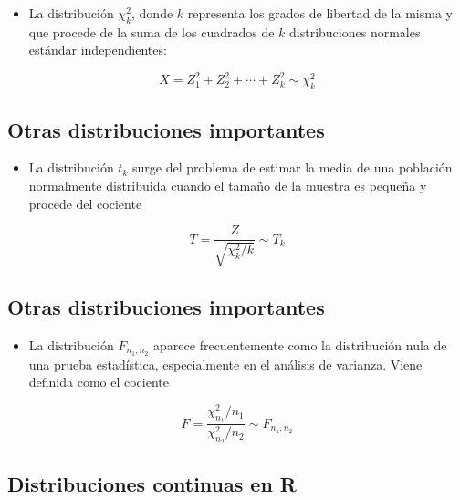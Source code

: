 \documentclass[
]{article}
\providecommand{\tightlist}{%
  \setlength{\itemsep}{0pt}\setlength{\parskip}{0pt}}
\begin{document}
\begin{itemize}
\tightlist
\item
  La distribución \(\chi^2_k\), donde \(k\) representa los grados de
  libertad de la misma y que procede de la suma de los cuadrados de
  \(k\) distribuciones normales estándar independientes:
\end{itemize}

\[X = Z_1^2 + Z_2^2+\cdots + Z_k^2\sim \chi_k^2\]

\hypertarget{otras-distribuciones-importantes-1}{%
\subsection{Otras distribuciones
importantes}\label{otras-distribuciones-importantes-1}}

\begin{itemize}
\tightlist
\item
  La distribución \(t_k\) surge del problema de estimar la media de una
  población normalmente distribuida cuando el tamaño de la muestra es
  pequeña y procede del cociente
\end{itemize}

\[T = \frac{Z}{\sqrt{\chi^2_k/k}}\sim T_k\]

\hypertarget{otras-distribuciones-importantes-2}{%
\subsection{Otras distribuciones
importantes}\label{otras-distribuciones-importantes-2}}

\begin{itemize}
\tightlist
\item
  La distribución \(F_{n_1,n_2}\) aparece frecuentemente como la
  distribución nula de una prueba estadística, especialmente en el
  análisis de varianza. Viene definida como el cociente
\end{itemize}

\[F = \frac{\chi^2_{n_1}/n_1}{\chi^2_{n_2}/n_2}\sim F_{n_1,n_2}\]

\hypertarget{distribuciones-continuas-en-r}{%
\subsection{Distribuciones continuas en
R}\label{distribuciones-continuas-en-r}}
\end{document}
